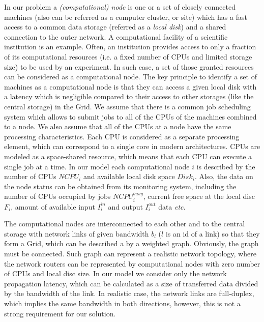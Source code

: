\documentclass{svjour3}                     %
\begin{document}
In our problem a \textit{(computational) node} is one or a set of closely connected machines (also can be referred as a computer cluster, or site) which has a fast access to a common data storage (referred as a \textit{local disk}) and a shared connection to the outer network. A computational facility of a scientific institution is an example. Often, an institution provides  access to only a fraction of its computational resources (i.e. a fixed number of CPUs and limited storage size) to be used by an experiment. In such case, a set of those granted resources can be considered as a computational node. The key principle to identify a set of machines as a computational node is that they can access a given local disk with a latency which is negligible compared to their access to other storages (like the central storage) in the Grid. We assume that there is a common job scheduling system which allows to submit jobs to all of the CPUs of the machines combined to a node. We also assume that all of the CPUs at a node have the same processing characteristics. Each CPU is considered as a separate processing element, which can correspond to a single core in modern architectures. CPUs are modeled as a space-shared resource, which means that each CPU can execute a single job at a time. In our model each computational node $i$ is described by the number of CPUs $NCPU_{i}$ and available local disk space $Disk_{i}$. Also, the data on the node status can be obtained from its monitoring system, including the number of CPUs occupied by jobs $NCPU_{i}^{busy}$, current free space at the local disc $F_{i}$, amount of available input $I_{i}^{in}$ and output $I_{i}^{out}$ data \textit{etc}.

The computational nodes are interconnected to each other and to the central storage with network links of given bandwidth $b_{l}$ ($l$ is an id of a link) so that they form a Grid, which can be described a by a weighted graph. Obviously, the graph must be connected. Such graph can represent a realistic network topology, where the network routers can be represented by computational nodes with zero number of CPUs and local disc size. In our model we consider only the network propagation latency, which can be calculated as a size of transferred data divided by the bandwidth of the link. In realistic case, the network links are full-duplex, which implies the same bandwidth in both directions, however, this is not a strong requirement for our solution.
\end{document}
